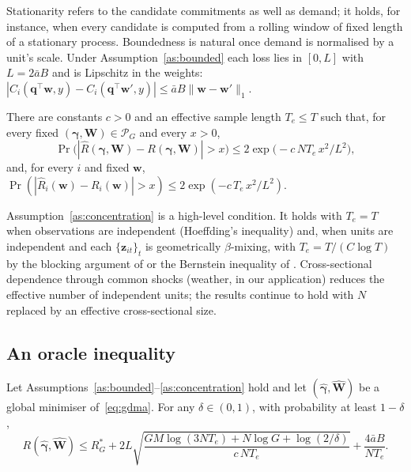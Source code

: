 Stationarity refers to the candidate commitments as well as demand; it holds, for instance, when every candidate is computed from a rolling window of fixed length of a stationary process.
Boundedness is natural once demand is normalised by a unit's scale.
Under Assumption~\ref{as:bounded} each loss lies in $[0,L]$ with $L=2\bar aB$ and is Lipschitz in the weights: $|C_i(\bm q^\top\bm w,y)-C_i(\bm q^\top\bm w',y)|\le\bar aB\|\bm w-\bm w'\|_1$.

\begin{assumption}[Concentration]\label{as:concentration}
There are constants $c>0$ and an effective sample length $T_e\le T$ such that, for every fixed $(\bm\gamma,\bm W)\in\mathcal P_G$ and every $x>0$,
\[
\Pr\big(|\widehat R(\bm\gamma,\bm W)-R(\bm\gamma,\bm W)|>x\big)\le 2\exp\!\big(-c\,N T_e\,x^2/L^2\big),
\]
and, for every $i$ and fixed $\bm w$, $\Pr(|\widehat R_i(\bm w)-R_i(\bm w)|>x)\le 2\exp(-c\,T_e\,x^2/L^2)$.
\end{assumption}

Assumption~\ref{as:concentration} is a high-level condition.
It holds with $T_e=T$ when observations are independent (Hoeffding's inequality) and, when units are independent and each $\{\bm z_{it}\}_t$ is geometrically $\beta$-mixing, with $T_e=T/(C\log T)$ by the blocking argument of \citet{Yu1994} or the Bernstein inequality of \citet{Merlevede2011}.
Cross-sectional dependence through common shocks (weather, in our application) reduces the effective number of independent units; the results continue to hold with $N$ replaced by an effective cross-sectional size.

\subsection{An oracle inequality}

\begin{theorem}\label{thm:oracle}
Let Assumptions~\ref{as:bounded}--\ref{as:concentration} hold and let $(\widehat{\bm\gamma},\widehat{\bm W})$ be a global minimiser of~\eqref{eq:gdma}.
For any $\delta\in(0,1)$, with probability at least $1-\delta$,
\begin{equation}\label{eq:oracle}
R(\widehat{\bm\gamma},\widehat{\bm W})\le R^*_G+2L\sqrt{\frac{GM\log(3NT_e)+N\log G+\log(2/\delta)}{c\,NT_e}}+\frac{4\bar aB}{NT_e}.
\end{equation}
\end{theorem}

